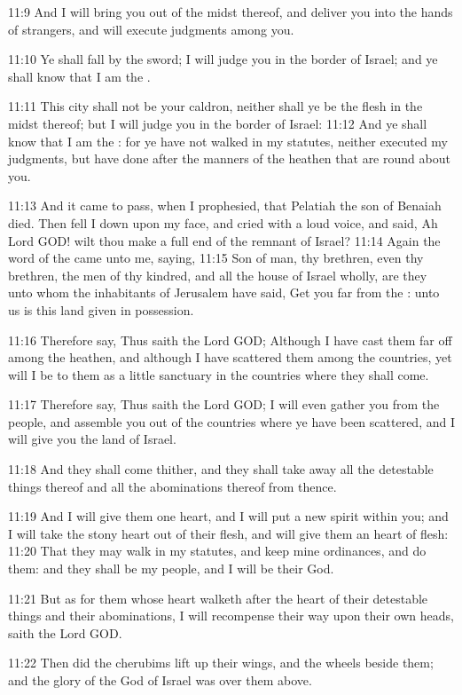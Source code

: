 11:9 And I will bring you out of the midst thereof, and deliver you into the hands of strangers, and will execute judgments among you.

11:10 Ye shall fall by the sword; I will judge you in the border of Israel; and ye shall know that I am the \LORD.

11:11 This city shall not be your caldron, neither shall ye be the flesh in the midst thereof; but I will judge you in the border of Israel: 11:12 And ye shall know that I am the \LORD: for ye have not walked in my statutes, neither executed my judgments, but have done after the manners of the heathen that are round about you.

11:13 And it came to pass, when I prophesied, that Pelatiah the son of Benaiah died. Then fell I down upon my face, and cried with a loud voice, and said, Ah Lord GOD! wilt thou make a full end of the remnant of Israel?  11:14 Again the word of the \LORD came unto me, saying, 11:15 Son of man, thy brethren, even thy brethren, the men of thy kindred, and all the house of Israel wholly, are they unto whom the inhabitants of Jerusalem have said, Get you far from the \LORD: unto us is this land given in possession.

11:16 Therefore say, Thus saith the Lord GOD; Although I have cast them far off among the heathen, and although I have scattered them among the countries, yet will I be to them as a little sanctuary in the countries where they shall come.

11:17 Therefore say, Thus saith the Lord GOD; I will even gather you from the people, and assemble you out of the countries where ye have been scattered, and I will give you the land of Israel.

11:18 And they shall come thither, and they shall take away all the detestable things thereof and all the abominations thereof from thence.

11:19 And I will give them one heart, and I will put a new spirit within you; and I will take the stony heart out of their flesh, and will give them an heart of flesh: 11:20 That they may walk in my statutes, and keep mine ordinances, and do them: and they shall be my people, and I will be their God.

11:21 But as for them whose heart walketh after the heart of their detestable things and their abominations, I will recompense their way upon their own heads, saith the Lord GOD.

11:22 Then did the cherubims lift up their wings, and the wheels beside them; and the glory of the God of Israel was over them above.


